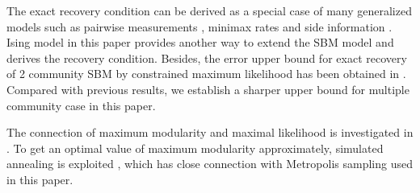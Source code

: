 \documentclass[entropy,article,submit,moreauthors,pdftex]{Definitions/mdpi}
\newcommand{\1}{\mathbbm{1}}
\begin{document}
The exact recovery condition can be derived as a special case of many generalized models such as pairwise measurements \cite{chen2016information},
minimax rates \cite{hajek2016achieving} and side information \cite{saad2018community}. Ising model in this paper provides another way to extend the
SBM model and derives the recovery condition. Besides,
the error upper bound for exact recovery of 2 community SBM by constrained maximum likelihood has been obtained in \cite{abbe2015exact}.
Compared with previous results, we establish a sharper upper bound for multiple community case in this paper.

The connection of maximum modularity and maximal likelihood is investigated in \cite{newman2016equivalence}. To get an optimal value
of maximum modularity approximately, simulated annealing is exploited \cite{he2016fast}, which has close connection with Metropolis sampling
used in this paper.

\end{document}
